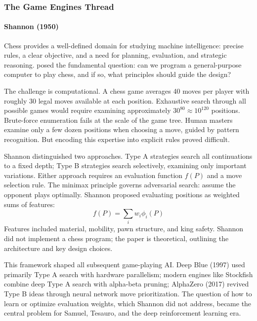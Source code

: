 \subsubsection{The Game Engines Thread}

\paragraph{Shannon (1950)}

Chess provides a well-defined domain for studying machine intelligence: precise rules, a clear objective, and a need for planning, evaluation, and strategic reasoning. \citet{Shannon1950} posed the fundamental question: can we program a general-purpose computer to play chess, and if so, what principles should guide the design?

The challenge is computational. A chess game averages 40 moves per player with roughly 30 legal moves available at each position. Exhaustive search through all possible games would require examining approximately $30^{80} \approx 10^{120}$ positions. Brute-force enumeration fails at the scale of the game tree. Human masters examine only a few dozen positions when choosing a move, guided by pattern recognition. But encoding this expertise into explicit rules proved difficult.

Shannon distinguished two approaches. Type A strategies search all continuations to a fixed depth; Type B strategies search selectively, examining only important variations. Either approach requires an evaluation function $f(P)$ and a move selection rule. The minimax principle governs adversarial search: assume the opponent plays optimally. Shannon proposed evaluating positions as weighted sums of features:
\begin{equation}
f(P) = \sum_i w_i \phi_i(P)
\end{equation}
Features included material, mobility, pawn structure, and king safety. Shannon did not implement a chess program; the paper is theoretical, outlining the architecture and key design choices.

This framework shaped all subsequent game-playing AI. Deep Blue (1997) used primarily Type A search with hardware parallelism; modern engines like Stockfish combine deep Type A search with alpha-beta pruning; AlphaZero (2017) revived Type B ideas through neural network move prioritization. The question of how to learn or optimize evaluation weights, which Shannon did not address, became the central problem for Samuel, Tesauro, and the deep reinforcement learning era.


